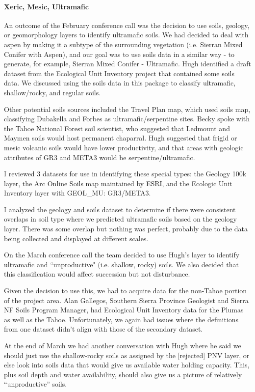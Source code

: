 \paragraph{Xeric, Mesic, Ultramafic}
An outcome of the February conference call was the decision to use soils, geology, or geomorphology layers to identify ultramafic soils. We had decided to deal with aspen by making it a subtype of the surrounding vegetation (i.e. Sierran Mixed Conifer with Aspen), and our goal was to use soils data in a similar way - to generate, for example, Sierran Mixed Conifer - Ultramafic. Hugh identified a draft dataset from the Ecological Unit Inventory project that contained some soils data. We discussed using the soils data in this package to classify ultramafic, shallow/rocky, and regular soils. 

Other potential soils sources included the Travel Plan map, which used soils map, classifying Dubakella and Forbes as ultramafic/serpentine sites. Becky spoke with the Tahoe National Forest soil scientist, who suggested that Ledmount and Maymen soils would host permanent chaparral. Hugh suggested that frigid or mesic volcanic soils would have lower productivity, and that areas with geologic attributes of GR3 and META3 would be serpentine/ultramafic.

I reviewed 3 datasets for use in identifying these special types: the Geology 100k layer, the Arc Online Soils map maintained by ESRI, and the Ecologic Unit Inventory layer with GEOL\_MU: GR3/META3.

I analyzed the geology and soils dataset to determine if there were consistent overlaps in soil type where we predicted ultramafic soils based on the geology layer. There was some overlap but nothing was perfect, probably due to the data being collected and displayed at different scales.

On the March conference call the team decided to use Hugh's layer to identify ultramafic and ``unproductive" (i.e. shallow, rocky) soils. We also decided that this classification would affect succession but not disturbance. 

Given the decision to use this, we had to acquire data for the non-Tahoe portion of the project area. Alan Gallegos, Southern Sierra Province Geologist and Sierra NF Soils Program Manager, had Ecological Unit Inventory data for the Plumas as well as the Tahoe. Unfortunately, we again had issues where the definitions from one dataset didn't align with those of the secondary dataset.

At the end of March we had another conversation with Hugh where he said we should just use the shallow-rocky soils as assigned by the [rejected] PNV layer, or else look into soils data that would give us available water holding capacity. This, plus soil depth and water availability, should also give us a picture of relatively ``unproductive'' soils.

